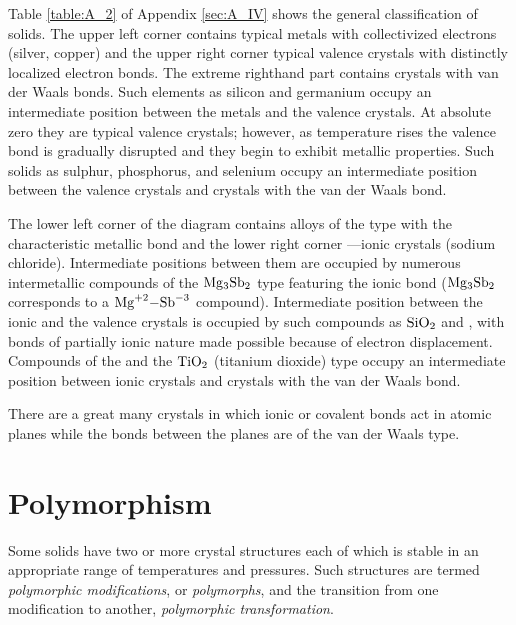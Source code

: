 Table \ref{table:A_2} of Appendix \ref{sec:A_IV} shows the general classification of solids. The upper left corner contains typical metals with collectivized electrons (silver, copper) and the upper right corner typical valence crystals with distinctly localized electron bonds. The extreme righthand part contains crystals with van der Waals bonds. Such elements as silicon and germanium occupy an intermediate position between the metals and the valence crystals. At absolute zero they are typical valence crystals; however, as temperature rises the valence bond is gradually disrupted and they begin to exhibit metallic properties. Such solids as sulphur, phosphorus, and selenium occupy an intermediate position between the valence crystals and crystals with the van der Waals bond.

The lower left corner of the diagram contains alloys of the  type with the characteristic metallic bond and the lower right corner ---ionic crystals (sodium chloride). Intermediate positions between them are occupied by numerous intermetallic compounds of the $\ce{Mg3Sb2}$ type featuring the ionic bond ($\ce{Mg3Sb2}$ corresponds to a $\ce{Mg^{+2}-Sb^{-3}}$ compound). Intermediate position between the ionic and the valence crystals is occupied by such compounds as $\ce{SiO2}$ and , with bonds of partially ionic nature made possible because of electron displacement. Compounds of the  and the $\ce{TiO2}$ (titanium dioxide) type occupy an intermediate position between ionic crystals and crystals with the van der Waals bond.

There are a great many crystals in which ionic or covalent bonds act in atomic planes while the bonds between the planes are of the van der Waals type.

\section{Polymorphism}\label{sec:11}

Some solids have two or more crystal structures each of which is stable in an appropriate range of temperatures and pressures. Such structures are termed \textit{polymorphic modifications}, or \textit{polymorphs},
and the transition from one modification to another, \textit{polymorphic
transformation}.

